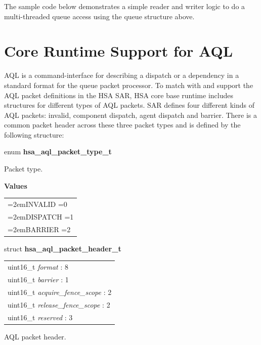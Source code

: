 \documentclass{book}
\newcommand{\hsaarg}[1]{\textit{#1}}
\newcommand{\hsadef}[2]{\hypertarget{#1}{\textbf{#2}}}
\begin{document}
The sample code below demonstrates a simple reader and writer logic
to do a multi-threaded queue access using the queue structure above.




\hypertarget{coreapi_AQL}{}\section{Core Runtime Support for
AQL}\label{AQL}
AQL is a command-interface for describing a dispatch or a dependency
in a standard format for the queue packet processor.
To match with and support the AQL packet definitions in the HSA SAR,
HSA core base runtime includes structures for different types of AQL
packets.  SAR defines four different kinds of AQL packets: invalid,
component dispatch, agent dispatch and barrier.  There is a common
packet header across these three packet types and is defined by the
following structure:

\makeatletter{}

\noindent\begin{tcolorbox}[nobeforeafter,arc=0mm,colframe=white,colback=lightgray,left=0mm]
enum \hsadef{group__aql__header_1gacc655159812af0a411cc5f70b3f54881}{hsa\_aql\_packet\_type\_t}
\end{tcolorbox}
Packet type.

\noindent\textbf{Values}\\[-5mm]
\begin{longtable}{@{}>{\hangindent=2em}p{\linewidth}}
INVALID =0\\[2mm]
DISPATCH =1\\[2mm]
BARRIER =2
\end{longtable}

\noindent\begin{tcolorbox}[breakable,nobeforeafter,arc=0mm,colframe=white,colback=lightgray,left=0mm]
struct \hsadef{group__aql__header_1ga92558e047d003985bae2558febd3dd40}{hsa\_aql\_packet\_header\_t}
\vspace{-3.5mm}\begin{longtable}{@{}p{\textwidth}}
\hspace{1.7em}uint16\_t \hsaarg{format} : 8\\
\hspace{1.7em}uint16\_t \hsaarg{barrier} : 1\\
\hspace{1.7em}uint16\_t \hsaarg{acquire\_fence\_scope} : 2\\
\hspace{1.7em}uint16\_t \hsaarg{release\_fence\_scope} : 2\\
\hspace{1.7em}uint16\_t \hsaarg{reserved} : 3
\end{longtable}

\end{tcolorbox}
AQL packet header.
\end{document}
